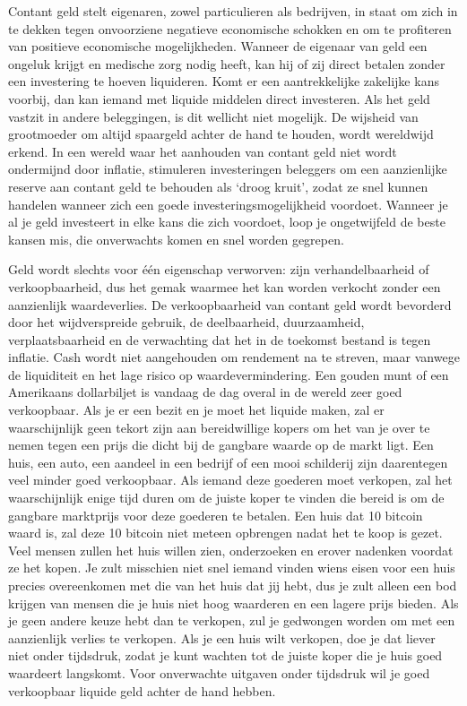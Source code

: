 \documentclass[
  a5paper,
  smalldemyvopaper,11pt,twoside,onecolumn,openright,extrafontsizes,
hidelinks]{memoir}
\begin{document}
Contant geld stelt eigenaren, zowel particulieren als bedrijven, in
staat om zich in te dekken tegen onvoorziene negatieve economische
schokken en om te profiteren van positieve economische mogelijkheden.
Wanneer de eigenaar van geld een ongeluk krijgt en medische zorg nodig
heeft, kan hij of zij direct betalen zonder een investering te hoeven
liquideren. Komt er een aantrekkelijke zakelijke kans voorbij, dan kan
iemand met liquide middelen direct investeren. Als het geld vastzit in
andere beleggingen, is dit wellicht niet mogelijk. De wijsheid van
grootmoeder om altijd spaargeld achter de hand te houden, wordt
wereldwijd erkend. In een wereld waar het aanhouden van contant geld
niet wordt ondermijnd door inflatie, stimuleren investeringen beleggers
om een aanzienlijke reserve aan contant geld te behouden als `droog
kruit', zodat ze snel kunnen handelen wanneer zich een goede
investeringsmogelijkheid voordoet. Wanneer je al je geld investeert in
elke kans die zich voordoet, loop je ongetwijfeld de beste kansen mis,
die onverwachts komen en snel worden gegrepen.

Geld wordt slechts voor één eigenschap verworven: zijn verhandelbaarheid
of verkoopbaarheid, dus het gemak waarmee het kan worden verkocht zonder
een aanzienlijk waardeverlies. De verkoopbaarheid van contant geld wordt
bevorderd door het wijdverspreide gebruik, de deelbaarheid,
duurzaamheid, verplaatsbaarheid en de verwachting dat het in de toekomst
bestand is tegen inflatie. Cash wordt niet aangehouden om rendement na
te streven, maar vanwege de liquiditeit en het lage risico op
waardevermindering. Een gouden munt of een Amerikaans dollarbiljet is
vandaag de dag overal in de wereld zeer goed verkoopbaar. Als je er een
bezit en je moet het liquide maken, zal er waarschijnlijk geen tekort
zijn aan bereidwillige kopers om het van je over te nemen tegen een
prijs die dicht bij de gangbare waarde op de markt ligt. Een huis, een
auto, een aandeel in een bedrijf of een mooi schilderij zijn daarentegen
veel minder goed verkoopbaar. Als iemand deze goederen moet verkopen,
zal het waarschijnlijk enige tijd duren om de juiste koper te vinden die
bereid is om de gangbare marktprijs voor deze goederen te betalen. Een
huis dat 10 bitcoin waard is, zal deze 10 bitcoin niet meteen opbrengen
nadat het te koop is gezet. Veel mensen zullen het huis willen zien,
onderzoeken en erover nadenken voordat ze het kopen. Je zult misschien
niet snel iemand vinden wiens eisen voor een huis precies overeenkomen
met die van het huis dat jij hebt, dus je zult alleen een bod krijgen
van mensen die je huis niet hoog waarderen en een lagere prijs bieden.
Als je geen andere keuze hebt dan te verkopen, zul je gedwongen worden
om met een aanzienlijk verlies te verkopen. Als je een huis wilt
verkopen, doe je dat liever niet onder tijdsdruk, zodat je kunt wachten
tot de juiste koper die je huis goed waardeert langskomt. Voor
onverwachte uitgaven onder tijdsdruk wil je goed verkoopbaar liquide
geld achter de hand hebben.
\end{document}
